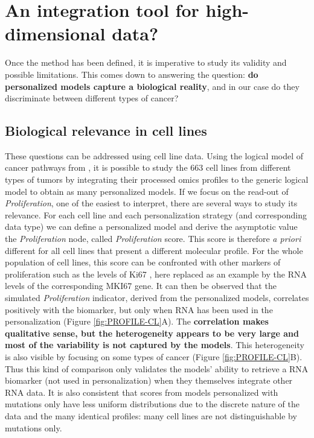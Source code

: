 \documentclass[a4paper,12pt,twoside,onecolumn,openright,final,oldfontcommands]{memoir}
\begin{document}
\section{An integration tool for high-dimensional
data?}\label{an-integration-tool-for-high-dimensional-data}

Once the method has been defined, it is imperative to study its validity
and possible limitations. This comes down to answering the question:
\textbf{do personalized models capture a biological reality}, and in our
case do they discriminate between different types of cancer?

\subsection{Biological relevance in cell lines}\label{PROFILE-CL}

These questions can be addressed using cell line data. Using the logical
model of cancer pathways from \citet{fumia2013boolean}, it is possible
to study the 663 cell lines from different types of tumors by
integrating their processed omics profiles to the generic logical model
to obtain as many personalized models. If we focus on the read-out of
\emph{Proliferation}, one of the easiest to interpret, there are several
ways to study its relevance. For each cell line and each personalization
strategy (and corresponding data type) we can define a personalized
model and derive the asymptotic value the \emph{Proliferation} node,
called \emph{Proliferation} score. This score is therefore \emph{a
priori} different for all cell lines that present a different molecular
profile. For the whole population of cell lines, this score can be
confronted with other markers of proliferation such as the levels of
Ki67 \citep{miller2018ki67}, here replaced as an example by the RNA
levels of the corresponding MKI67 gene. It can then be observed that the
simulated \emph{Proliferation} indicator, derived from the personalized
models, correlates positively with the biomarker, but only when RNA has
been used in the personalization (Figure \ref{fig:PROFILE-CL}A). The
\textbf{correlation makes qualitative sense, but the heterogeneity
appears to be very large and most of the variability is not captured by
the models}. This heterogeneity is also visible by focusing on some
types of cancer (Figure \ref{fig:PROFILE-CL}B). Thus this kind of
comparison only validates the models' ability to retrieve a RNA
biomarker (not used in personalization) when they themselves integrate
other RNA data. It is also consistent that scores from models
personalized with mutations only have less uniform distributions due to
the discrete nature of the data and the many identical profiles: many
cell lines are not distinguishable by mutations only.
\end{document}
